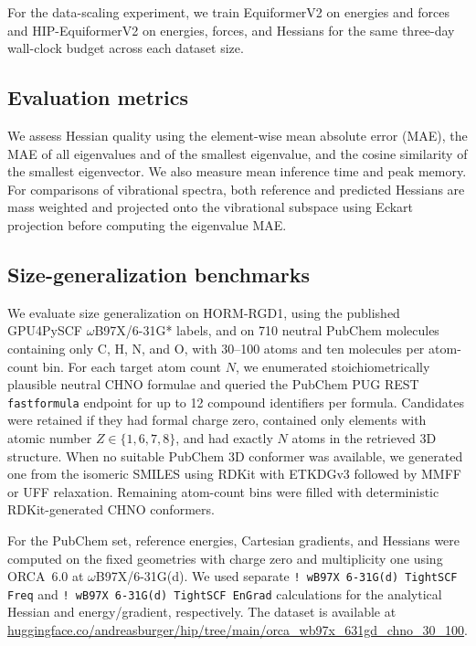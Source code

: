 \documentclass[pdflatex,sn-mathphys-num]{sn-jnl}%
\begin{document}
For the data-scaling experiment, we train EquiformerV2 on energies and forces and HIP-EquiformerV2 on energies, forces, and Hessians for the same three-day wall-clock budget across each dataset size.

\subsection{Evaluation metrics}
We assess Hessian quality using the element-wise mean absolute error (MAE), the MAE of all eigenvalues and of the smallest eigenvalue, and the cosine similarity of the smallest eigenvector. We also measure mean inference time and peak memory. For comparisons of vibrational spectra, both reference and predicted Hessians are mass weighted and projected onto the vibrational subspace using Eckart projection before computing the eigenvalue MAE.

\subsection{Size-generalization benchmarks}
We evaluate size generalization on HORM-RGD1, using the published GPU4PySCF $\omega$B97X/6-31G* labels, and on 710 neutral PubChem molecules containing only C, H, N, and O, with 30--100 atoms and ten molecules per atom-count bin. For each target atom count \(N\), we enumerated stoichiometrically plausible neutral CHNO formulae and queried the PubChem PUG REST \texttt{fastformula} endpoint for up to 12 compound identifiers per formula. Candidates were retained if they had formal charge zero, contained only elements with atomic number \(Z\in\{1,6,7,8\}\), and had exactly \(N\) atoms in the retrieved 3D structure. When no suitable PubChem 3D conformer was available, we generated one from the isomeric SMILES using RDKit with ETKDGv3 followed by MMFF or UFF relaxation. Remaining atom-count bins were filled with deterministic RDKit-generated CHNO conformers.

For the PubChem set, reference energies, Cartesian gradients, and Hessians were computed on the fixed geometries with charge zero and multiplicity one using ORCA~6.0 \citep{ORCA} at $\omega$B97X/6-31G(d). We used separate \texttt{! wB97X 6-31G(d) TightSCF Freq} and \texttt{! wB97X 6-31G(d) TightSCF EnGrad} calculations for the analytical Hessian and energy/gradient, respectively. The dataset is available at \url{huggingface.co/andreasburger/hip/tree/main/orca_wb97x_631gd_chno_30_100}.
\end{document}
